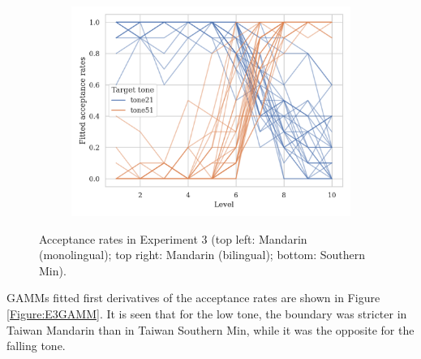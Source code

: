 \begin{figure}[hbt!]
\begin{subfigure}[b]{.45\textwidth}
\includegraphics[width=\textwidth]{figures/E3/Min_E3_raw.png}
\end{subfigure}
\caption{Acceptance rates in Experiment 3 (top left: Mandarin (monolingual); top right: Mandarin (bilingual); bottom: Southern Min).}
\label{Figure:E3Raw}
\end{figure}

GAMMs fitted first derivatives of the acceptance rates are shown in Figure \ref{Figure:E3GAMM}. It is seen that for the low tone, the boundary was stricter in Taiwan Mandarin than in Taiwan Southern Min, while it was the opposite for the falling tone.

